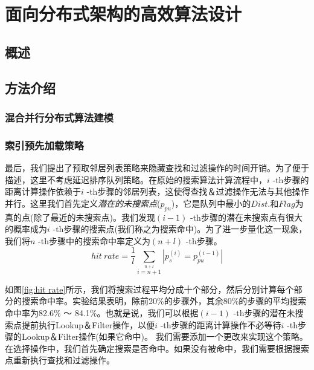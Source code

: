 
\chapter{面向分布式架构的高效算法设计}


\section{概述}\label{sec:dist-overview}


\section{方法介绍}\label{sec:dist-method}

\subsection{混合并行分布式算法建模}\label{sec:dist-method-model}

\subsection{索引预先加载策略}\label{sec:dist-method-index}
最后，我们提出了预取邻居列表策略来隐藏查找和过滤操作的时间开销。为了便于描述，这里不考虑延迟排序队列策略。在原始的搜索算法计算流程中，$i$ -th步骤的距离计算操作依赖于$i$ -th步骤的邻居列表，这使得查找＆过滤操作无法与其他操作并行。这里我们首先定义\textit{潜在的未搜索点}($p_{pu}$)，它是队列中最小的$Dist.$和$Flag$为真的点(除了最近的未搜索点)。我们发现$(i-1)$ -th步骤的潜在未搜索点有很大的概率成为$i$ -th步骤的搜索点(我们称之为搜索命中)。为了进一步量化这一现象，我们将$n$ -th步骤中的搜索命中率定义为$(n+l)$ -th步骤。
\begin{equation}\label{eq:hit rate}
hit\ rate = \frac{1}{l}\sum\limits_{i=n+1}\limits^{n+l}{\left| p_s^{(i)} = p_{pu}^{(i-1)} \right|}
\end{equation}

如图\ref{fig:hit rate}所示，我们将搜索过程平均分成十个部分，然后分别计算每个部分的搜索命中率。实验结果表明，除前20\%的步骤外，其余80\%的步骤的平均搜索命中率为82.6\% ～ 84.1\%。也就是说，我们可以根据$(i-1)$ -th步骤的潜在未搜索点提前执行Lookup＆Filter操作，以便$i$ -th步骤的距离计算操作不必等待$i$ -th步骤的Lookup＆Filter操作(如果它命中)。
我们需要添加一个更改来实现这个策略。在选择操作中，我们首先确定搜索是否命中。如果没有被命中，我们需要根据搜索点重新执行查找和过滤操作。

